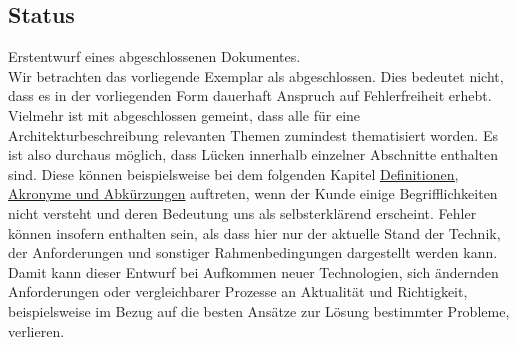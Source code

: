 \documentclass[enabledeprecatedfontcommands,fontsize=11pt,paper=a4,twoside]{scrartcl}
\newcounter{one}
\begin{document}
\subsection{Status}
Erstentwurf eines abgeschlossenen Dokumentes. \\
Wir betrachten das vorliegende Exemplar als abgeschlossen. Dies bedeutet nicht, dass es in der vorliegenden Form dauerhaft Anspruch auf Fehlerfreiheit erhebt. Vielmehr ist mit abgeschlossen gemeint, dass alle für eine Architekturbeschreibung relevanten Themen zumindest thematisiert worden. Es ist also durchaus möglich, dass Lücken innerhalb einzelner Abschnitte enthalten sind. Diese können beispielsweise bei dem folgenden Kapitel \hyperref[sec:daa]{Definitionen, Akronyme und Abkürzungen} auftreten, wenn der Kunde einige Begrifflichkeiten nicht versteht und deren Bedeutung uns als selbsterklärend erscheint. Fehler können insofern enthalten sein, als dass hier nur der aktuelle Stand der Technik, der Anforderungen und sonstiger Rahmenbedingungen dargestellt werden kann. Damit kann dieser Entwurf bei Aufkommen neuer Technologien, sich ändernden Anforderungen oder vergleichbarer Prozesse an Aktualität und Richtigkeit, beispielsweise im Bezug auf die besten Ansätze zur Lösung bestimmter Probleme, verlieren.

\newpage
\end{document}
